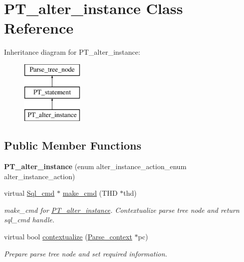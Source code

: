 \hypertarget{classPT__alter__instance}{}\section{P\+T\+\_\+alter\+\_\+instance Class Reference}
\label{classPT__alter__instance}
Inheritance diagram for P\+T\+\_\+alter\+\_\+instance\+:\begin{figure}[H]
\begin{center}
\leavevmode
\includegraphics[height=3.000000cm]{classPT__alter__instance}
\end{center}
\end{figure}
\subsection*{Public Member Functions}
\begin{DoxyCompactItemize}
\item 
\mbox{\label{classPT__alter__instance_ab8cf3be34125b9d3bdf62207a55475c1}} 
{\bfseries P\+T\+\_\+alter\+\_\+instance} (enum alter\+\_\+instance\+\_\+action\+\_\+enum alter\+\_\+instance\+\_\+action)
\item 
virtual \mbox{\hyperlink{classSql__cmd}{Sql\+\_\+cmd}} $\ast$ \mbox{\hyperlink{classPT__alter__instance_add0b06c63a75335090db15534050b144}{make\+\_\+cmd}} (T\+HD $\ast$thd)
\begin{DoxyCompactList}\small\item\em make\+\_\+cmd for \mbox{\hyperlink{classPT__alter__instance}{P\+T\+\_\+alter\+\_\+instance}}. Contextualize parse tree node and return sql\+\_\+cmd handle. \end{DoxyCompactList}\item 
virtual bool \mbox{\hyperlink{classPT__alter__instance_a802bf9ac570878d8e0ea64a315cf6b95}{contextualize}} (\mbox{\hyperlink{structParse__context}{Parse\+\_\+context}} $\ast$pc)
\begin{DoxyCompactList}\small\item\em Prepare parse tree node and set required information. \end{DoxyCompactList}\end{DoxyCompactItemize}
